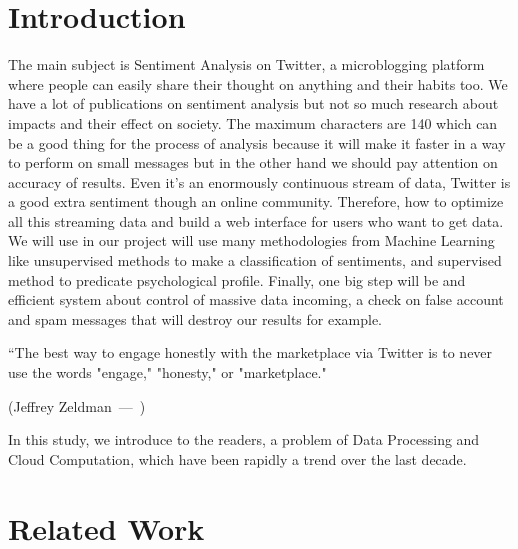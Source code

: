 \documentclass{acmtog} %
\let\oldquote\quote
\let\endoldquote\endquote
\renewenvironment{quote}[2][]
  {\if\relax\detokenize{#1}\relax
     \def\quoteauthor{#2}%
   \else
     \def\quoteauthor{#2~---~#1}%
   \fi
   \oldquote}
  {\par\nobreak\smallskip\hfill(\quoteauthor)%
   \endoldquote\addvspace{\bigskipamount}}
\begin{document}
\section{Introduction}
The main subject is Sentiment Analysis on Twitter, a microblogging platform where people can easily share their thought on anything and their habits too. We have a lot of publications on sentiment analysis but not so much research about impacts and their effect on society. The maximum characters are 140 which can be a good thing for the process of analysis because it will make it faster in a way to perform on small messages but in the other hand we should pay attention on accuracy of results. Even it’s an enormously continuous stream of data, Twitter is a good extra sentiment though an online community. Therefore, how to optimize all this streaming data and build a web interface for users who want to get data. We will use in our project will use many methodologies from Machine Learning like unsupervised methods to make a classification of sentiments, and supervised method to predicate psychological profile. Finally, one big step will be and efficient system about control of massive data incoming, a check on false account and spam messages that will destroy our results for example.
 
\begin{quote}{Jeffrey Zeldman}
“The best way to engage honestly with the marketplace via Twitter is to never use the words "engage," "honesty," or "marketplace." 
\end{quote}

In this study, we introduce to the readers, a problem of Data Processing and Cloud Computation, which have been rapidly a trend over the last decade. 

\section{Related Work}
\label{sec:related_work}
\end{document}
